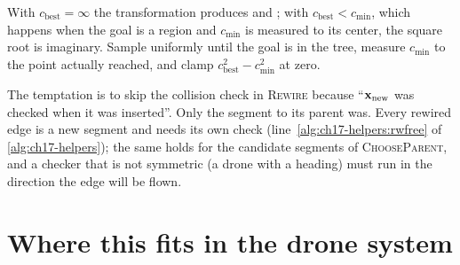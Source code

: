 \begin{pitfall}
With $c_{\mathrm{best}}=\infty$ the transformation produces  and
; with $c_{\mathrm{best}}<c_{\min}$, which happens when the goal
is a region and $c_{\min}$ is measured to its center, the square root is
imaginary. Sample uniformly until the goal is in the tree, measure
$c_{\min}$ to the point actually reached, and clamp
$c_{\mathrm{best}}^2-c_{\min}^2$ at zero.
\end{pitfall}

\begin{pitfall}
The temptation is to skip the collision check in \textsc{Rewire} because
``$\mathbf{x}_{\mathrm{new}}$ was checked when it was inserted''. Only the segment to
its parent was. Every rewired edge is a new segment and needs its own check
(line~\ref{alg:ch17-helpers:rwfree} of \cref{alg:ch17-helpers}); the same
holds for the candidate segments of \textsc{ChooseParent}, and a checker that is not symmetric (a drone with a heading) must run in
the direction the edge will be flown.
\end{pitfall}

\section{Where this fits in the drone system}
\label{sec:ch17-drone}

